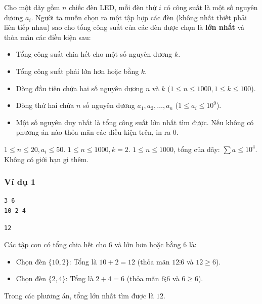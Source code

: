 
Cho một dãy gồm $n$ chiếc đèn LED, mỗi đèn thứ $i$ có công suất là một số nguyên dương $a_i$. Người ta muốn chọn ra một tập hợp các đèn (không nhất thiết phải liên tiếp nhau) sao cho tổng công suất của các đèn được chọn là \textbf{lớn nhất} và thỏa mãn các điều kiện sau:

\begin{itemize}
    \item Tổng công suất chia hết cho một số nguyên dương $k$.
    \item Tổng công suất phải lớn hơn hoặc bằng $k$.
\end{itemize}

\begin{itemize}
    \item Dòng đầu tiên chứa hai số nguyên dương $n$ và $k$ ($1 \le n \le 1000, 1 \le k \le 100$).
    \item Dòng thứ hai chứa $n$ số nguyên dương $a_1, a_2, \dots, a_n$ ($1 \le a_i \le 10^9$).
\end{itemize}

\begin{itemize}
    \item Một số nguyên duy nhất là tổng công suất lớn nhất tìm được. Nếu không có phương án nào thỏa mãn các điều kiện trên, in ra $0$.
\end{itemize}

\begin{makesubtasks}
     $1 \le n \le 20, a_i \le 50$.
     $1 \le n \le 1000, k = 2$.
     $1 \le n \le 1000$, tổng của dãy: $\sum a \le 10^4$.
     Không có giới hạn gì thêm.
\end{makesubtasks}


\subsubsection*{Ví dụ 1}
\begin{makesample}
\begin{lstlisting}
3 6
10 2 4
\end{lstlisting}
\nextsample
\begin{lstlisting}
12
\end{lstlisting}
\end{makesample}

\begin{explain}
Các tập con có tổng chia hết cho $6$ và lớn hơn hoặc bằng $6$ là:
\begin{itemize}
    \item Chọn đèn $\{10, 2\}$: Tổng là $10 + 2 = 12$ (thỏa mãn $12 \vdots 6$ và $12 \ge 6$).
    \item Chọn đèn $\{2, 4\}$: Tổng là $2 + 4 = 6$ (thỏa mãn $6 \vdots 6$ và $6 \ge 6$).
\end{itemize}

Trong các phương án, tổng lớn nhất tìm được là $12$.
\end{explain}
